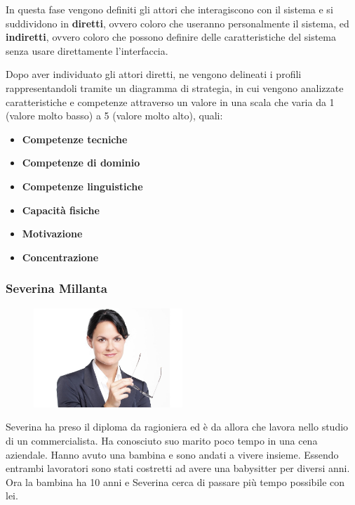 \documentclass[12pt,italian,]{report}
\providecommand{\tightlist}{%
  \setlength{\itemsep}{0pt}\setlength{\parskip}{0pt}}
\begin{document}
In questa fase vengono definiti gli attori che interagiscono con il
sistema e si suddividono in \textbf{diretti}, ovvero coloro che
useranno personalmente il sistema, ed \textbf{indiretti}, ovvero coloro
che possono definire delle caratteristiche del sistema senza usare
direttamente l'interfaccia.

Dopo aver individuato gli attori diretti, ne vengono delineati i profili
rappresentandoli tramite un diagramma di strategia, in cui vengono
analizzate caratteristiche e competenze attraverso un valore in una
scala che varia da 1 (valore molto basso) a 5 (valore molto alto),
quali:

\begin{itemize}
\tightlist
\item
  \textbf{Competenze tecniche}
\item
  \textbf{Competenze di dominio}
\item
  \textbf{Competenze linguistiche}
\item
  \textbf{Capacità fisiche}
\item
  \textbf{Motivazione}
\item
  \textbf{Concentrazione}
\end{itemize}

\hypertarget{severina-millanta-1}{%
\subsubsection{Severina Millanta}\label{severina-millanta-1}}

\begin{figure}[h]
\centering
\includegraphics[width=0.5\textwidth,height=\textheight]{img/severina.jpg}
\end{figure}

Severina ha preso il diploma da ragioniera ed è da allora che lavora
nello studio di un commercialista. Ha conosciuto suo marito poco tempo
in una cena aziendale. Hanno avuto una bambina e sono andati a vivere
insieme. Essendo entrambi lavoratori sono stati costretti ad avere una
babysitter per diversi anni. Ora la bambina ha 10 anni e Severina cerca
di passare più tempo possibile con lei.
\end{document}
